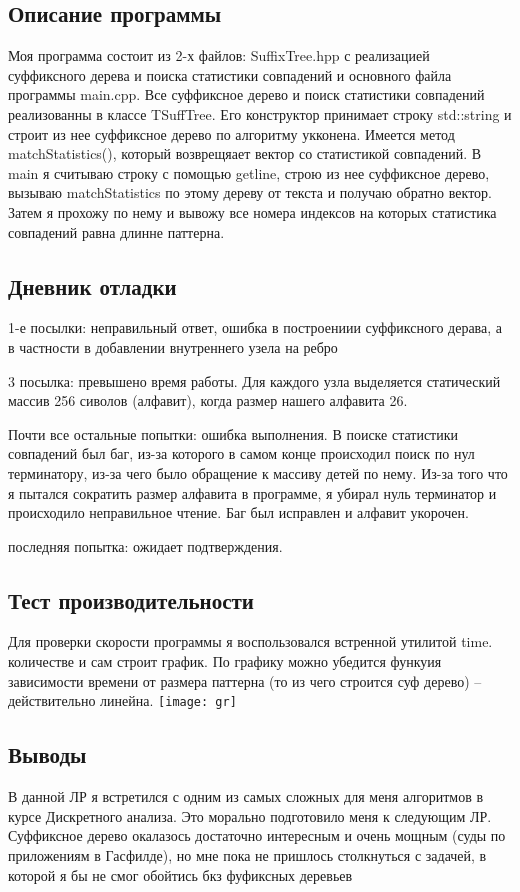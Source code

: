 \documentclass[12pt]{article}
\begin{document}
\subsection*{Описание программы}

Моя программа состоит из 2-х файлов: SuffixTree.hpp с реализацией суффиксного дерева
и поиска статистики совпадений и основного файла программы main.cpp. Все суффиксное
дерево и поиск статистики совпадений реализованны в классе TSuffTree. Его конструктор
принимает строку std::string и строит из нее суффиксное дерево по алгоритму укконена.
Имеется метод matchStatistics(), который возврещяает вектор со статистикой
совпадений. В main я считываю строку с помощью getline, строю из нее суффиксное
дерево, вызываю matchStatistics по этому дереву от текста и получаю обратно вектор.
Затем я прохожу по нему и вывожу все номера индексов на которых статистика совпадений
равна длинне паттерна.

\subsection*{Дневник отладки}

1-е посылки: неправильный ответ, ошибка в построениии суффиксного дерава, а в частности в добавлении внутреннего узела на ребро
 
3 посылка: превышено время работы. Для каждого узла выделяется статический массив 256 сиволов (алфавит), когда размер нашего алфавита 26.

Почти все остальные попытки: ошибка выполнения. В поиске статистики совпадений был баг, из-за которого в самом конце происходил поиск по нул терминатору, из-за чего было обращение к массиву детей по нему. Из-за того что я пытался сократить размер алфавита в программе, я убирал нуль терминатор и происходило неправильное чтение. Баг был исправлен и алфавит укорочен.

последняя попытка: ожидает подтверждения.

\subsection*{Тест производительности}
Для проверки скорости программы я воспользовался встренной утилитой time. 
количестве и сам строит график. По графику можно убедится функуия зависимости времени
от размера паттерна (то из чего строится суф дерево) -- действительно линейна.
\texttt{[image: gr]}

\subsection*{Выводы}

В данной ЛР я встретился с одним из самых сложных для меня алгоритмов в курсе Дискретного анализа. Это морально подготовило меня к следующим ЛР. Суффиксное дерево окалазось достаточно интересным и очень мощным (суды по приложениям в Гасфилде), но мне пока не пришлось столкнуться с задачей, в которой я бы не смог обойтись бкз фуфиксных деревьев 
\end{document}
